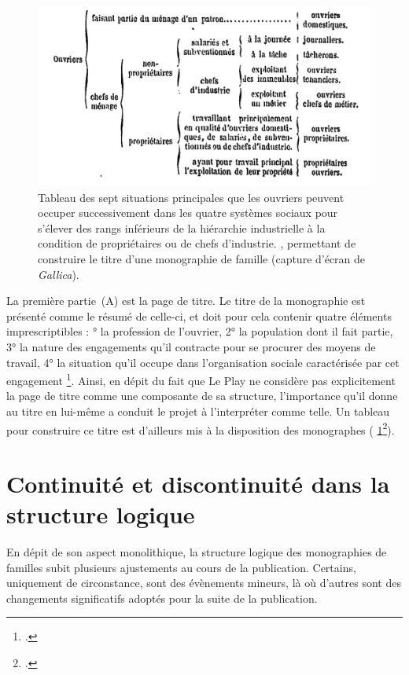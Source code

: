 \begin{figure}[h]
    \centering
    \includegraphics{img/tabl_titres.jpg}
    \caption[Tableau des sept situations principales que les ouvriers peuvent occuper successivement]{\og Tableau des sept situations principales que les ouvriers peuvent occuper successivement dans les quatre systèmes sociaux pour s'élever des rangs inférieurs de la hiérarchie industrielle à la condition de propriétaires ou de chefs d'industrie. \fg{}, permettant de construire le titre d'une monographie de famille (capture d'écran de \textit{Gallica}).}
    \label{tabletitre}
\end{figure}

La première partie~(A) est la page de titre. Le titre de la monographie est présenté comme le \og résumé \fg{} de celle-ci, et doit pour cela contenir quatre éléments imprescriptibles : ° la profession de l'ouvrier, 2° la population dont il fait partie, 3° la nature des engagements qu'il contracte pour se procurer des moyens de travail, 4° la situation qu'il occupe dans l'organisation sociale caractérisée par cet engagement \fg{}\footcite[p. 20]{instruction62}. Ainsi, en dépit du fait que Le Play ne considère pas explicitement la page de titre comme une composante de sa structure, l'importance qu'il donne au titre en lui-même a conduit le projet \timeus{} à l'interpréter comme telle. Un tableau pour construire ce titre est d'ailleurs mis à la disposition des monographes (\fig{} \ref{tabletitre}\footcite[p. 21 .]{instruction62}).

\section[Continuité et discontinuité]{Continuité et discontinuité dans la structure logique}

En dépit de son aspect monolithique, la structure logique des monographies de familles subit plusieurs ajustements au cours de la publication. Certains, uniquement de circonstance, sont des évènements mineurs, là où d'autres sont des changements significatifs adoptés pour la suite de la publication.

